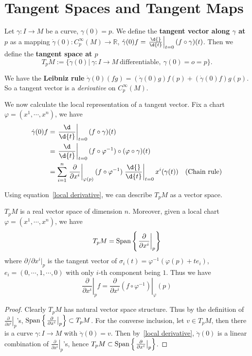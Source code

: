 \section{Tangent Spaces and Tangent Maps}

\begin{defn}
    Let $\gamma:I\to M$ be a curve, $\gamma(0)=p$.
    We define the \textbf{tangent vector along $\gamma$ at $p$} as a mapping $\dot{\gamma}(0):C^\infty_p(M)\to\mathbb{R}$, $\dot{\gamma}(0)f=\left.\frac{\d{}}{\d{t}}\right|_{t=0}(f\circ\gamma)(t)$.
    Then we define the \textbf{tangent space at $p$}
    \[T_pM:=\{\dot{\gamma}(0)|\ \gamma:I\to M\ \text{differentiable},\ \gamma(0)=o=p\}.\]
\end{defn}

\begin{prop}
    We have the \textbf{Leibniz rule} $\dot{\gamma}(0)(fg)=(\dot{\gamma}(0)g)f(p)+(\dot{\gamma}(0)f)g(p)$.
    So a tangent vector is a \emph{derivative} on $C^\infty_p(M)$.
\end{prop}

We now calculate the local representation of a tangent vector.
Fix a chart $\varphi=(x^1,\cdots,x^n)$, we have
\begin{equation}
    \begin{aligned}
        \dot{\gamma}(0)f&=\left.\frac{\d}{\d{t}}\right|_{t=0}(f\circ\gamma)(t)\\
        &=\left.\frac{\d}{\d{t}}\right|_{t=0}(f\circ\varphi^{-1})\circ(\varphi\circ\gamma)(t)\\
        &=\sum_{i=1}^n\left.\frac{\partial{}}{\partial{x^i}}\right|_{\varphi(p)}(f\circ\varphi^{-1})\left.\frac{\d{}}{\d{t}}\right|_{t=0}x^i(\gamma(t))\quad\text{(Chain rule)}
    \end{aligned}\label{local derivative}
\end{equation}

Using equation~\eqref{local derivative}, we can describe $T_pM$ as a vector space.
\begin{prop}
    $T_pM$ is a real vector space of dimension $n$.
    Moreover, given a local chart $\varphi=(x^1,\cdots,x^n)$, we have
    \[T_pM=\operatorname{Span}\left\{\left.\frac{\partial{}}{\partial{x^i}}\right|_p\right\}\]
    where $\partial{}/\partial{x^i}|_p$ is the tangent vector of $\sigma_i(t)=\varphi^{-1}(\varphi(p)+te_i)$, $e_i=(0,\cdots,1,\cdots,0)$ with only $i$-th component being $1$.
    Thus we have
    \[\left.\frac{\partial{}}{\partial{x^i}}\right|_pf=\left.\frac{\partial{}}{\partial{x^i}}(f\circ\varphi^{-1})\right|_\varphi(p)\]
\end{prop}
\begin{proof}
    Clearly $T_pM$ has natural vector space structure.
    Thus by the definition of $\left.\frac{\partial{}}{\partial{x^i}}\right|_p$'s, $\operatorname{Span}\left\{\left.\frac{\partial{}}{\partial{x^i}}\right|_p\right\}\subset T_pM$.
    For the converse inclusion, let $v\in T_pM$, then there is a curve $\gamma:I\to M$ with $\dot{\gamma}(0)=v$.
    Then by~\eqref{local derivative}, $\dot{\gamma}(0)$ is a linear combination of $\left.\frac{\partial{}}{\partial{x^i}}\right|_p$'s, hence $T_pM\subset\operatorname{Span}\left\{\left.\frac{\partial{}}{\partial{x^i}}\right|_p\right\}$.
\end{proof}

